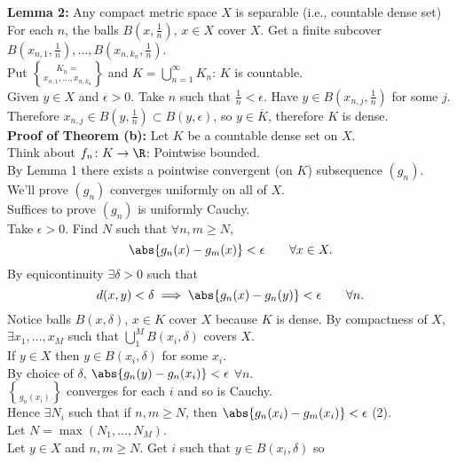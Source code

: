 \textbf{Lemma 2: }Any compact metric space $X$ is separable (i.e., countable dense set) \\
\pf For each $n$, the balls $B(x,\frac1n)$, $x\in X$ cover $X$.  Get a finite subcover $B(x_{n,1},\frac1n),\dotsc,B(x_{n,k_n},\frac1n)$. \\
Put $K_n=\brace{x_{n,1},\dotsc,x_{n,k_n}}$ and $K=\bigcup_{n=1}^\infty K_n$: $K$ is countable. \\
Given $y\in X$ and $\epsilon>0$.  Take $n$ such that $\frac1n<\epsilon$.  Have $y\in B(x_{n,j},\frac1n)$ for some $j$. \\
Therefore $x_{n,j}\in B(y,\frac1n)\subset B(y,\epsilon)$, so $y\in\overline K$, therefore $K$ is dense. \\
\textbf{Proof of Theorem (b):} Let $K$ be a countable dense set on $X$. \\
Think about $f_n\colon K\to\R$: Pointwise bounded. \\
By Lemma 1 there exists a pointwise convergent (on $K$) subsequence $(g_n)$. \\
We'll prove $(g_n)$ converges uniformly on all of $X$. \\
Suffices to prove $(g_n)$ is uniformly Cauchy. \\
Take $\epsilon>0$.  Find $N$ such that $\forall n,m\geq N$,
\[ \abs{g_n(x)-g_m(x)}<\epsilon \qquad \forall x\in X . \]
By equicontinuity $\exists\delta>0$ such that
\[ d(x,y)<\delta \implies \abs{g_n(x)-g_n(y)}<\epsilon \qquad \forall n . \]
Notice balls $B(x,\delta)$, $x\in K$ cover $X$ because $K$ is dense.  By compactness of $X$, $\exists x_1,\dotsc,x_M$ such that $\bigcup_1^M B(x_i,\delta)$ covers $X$. \\
If $y\in X$ then $y\in B(x_i,\delta)$ for some $x_i$. \\
By choice of $\delta$, $\abs{g_n(y)-g_n(x_i)}<\epsilon$ $\forall n$. \\
$\brace{g_n(x_i)}$ converges for each $i$ and so is Cauchy. \\
Hence $\exists N_i$ such that if $n,m\geq N$, then $\abs{g_n(x_i)-g_m(x_i)}<\epsilon$ (2). \\
Let $N=\max(N_1,\dotsc,N_M)$. \\
Let $y\in X$ and $n,m\geq N$.  Get $i$ such that $y\in B(x_i,\delta)$ so
